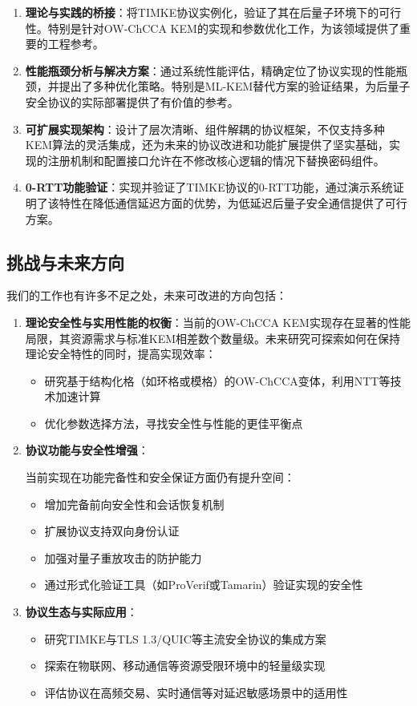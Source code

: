 \begin{enumerate}
  \item \textbf{理论与实践的桥接}：将TIMKE协议实例化，验证了其在后量子环境下的可行性。特别是针对OW-ChCCA KEM的实现和参数优化工作，为该领域提供了重要的工程参考。
  
  \item \textbf{性能瓶颈分析与解决方案}：通过系统性能评估，精确定位了协议实现的性能瓶颈，并提出了多种优化策略。特别是ML-KEM替代方案的验证结果，为后量子安全协议的实际部署提供了有价值的参考。

  \item \textbf{可扩展实现架构}：设计了层次清晰、组件解耦的协议框架，不仅支持多种KEM算法的灵活集成，还为未来的协议改进和功能扩展提供了坚实基础，实现的注册机制和配置接口允许在不修改核心逻辑的情况下替换密码组件。

  \item \textbf{0-RTT功能验证}：实现并验证了TIMKE协议的0-RTT功能，通过演示系统证明了该特性在降低通信延迟方面的优势，为低延迟后量子安全通信提供了可行方案。
\end{enumerate}

\subsection{挑战与未来方向}

我们的工作也有许多不足之处，未来可改进的方向包括：
\begin{enumerate}
  \item \textbf{理论安全性与实用性能的权衡}：当前的OW-ChCCA KEM实现存在显著的性能局限，其资源需求与标准KEM相差数个数量级。未来研究可探索如何在保持理论安全特性的同时，提高实现效率：
  \begin{itemize}
      \item 研究基于结构化格（如环格或模格）的OW-ChCCA变体，利用NTT等技术加速计算
      \item 优化参数选择方法，寻找安全性与性能的更佳平衡点
  \end{itemize}
  
  \item \textbf{协议功能与安全性增强}：
  
  当前实现在功能完备性和安全保证方面仍有提升空间：
  \begin{itemize}
      \item 增加完备前向安全性和会话恢复机制
      \item 扩展协议支持双向身份认证
      \item 加强对量子重放攻击的防护能力
      \item 通过形式化验证工具（如ProVerif或Tamarin）验证实现的安全性
  \end{itemize}
  
  \item \textbf{协议生态与实际应用}：
  \begin{itemize}
      \item 研究TIMKE与TLS 1.3/QUIC等主流安全协议的集成方案
      \item 探索在物联网、移动通信等资源受限环境中的轻量级实现
      \item 评估协议在高频交易、实时通信等对延迟敏感场景中的适用性
  \end{itemize}
\end{enumerate}

